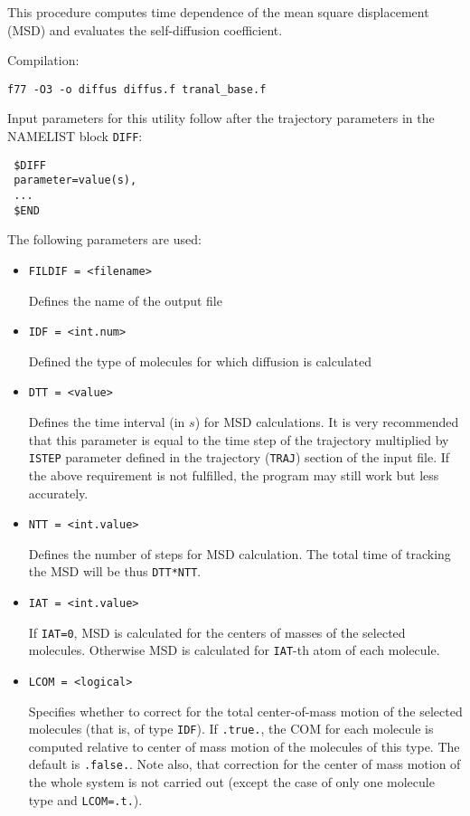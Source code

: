\documentclass{article}
\begin{document}
This procedure computes time dependence of the mean square displacement
(MSD) and evaluates the self-diffusion coefficient.

Compilation:

\verb|f77 -O3 -o diffus diffus.f tranal_base.f|

Input parameters for this utility follow after the trajectory parameters
in the NAMELIST block \verb|DIFF|:

\begin{verbatim}
 $DIFF
 parameter=value(s),
 ...
 $END
\end{verbatim}

The following parameters are used:

\begin{itemize}

\item
\verb|FILDIF = <filename>|

Defines the name of the output file

\item
\verb|IDF = <int.num>|

Defined the type of molecules for which diffusion is calculated

\item
\verb|DTT = <value>|

Defines the time interval (in $s$) for MSD calculations. It is very recommended
that this parameter is equal to the time step of the trajectory multiplied
by \verb|ISTEP| parameter defined in the trajectory (\verb|TRAJ|) section
of the input file. If the above requirement is not fulfilled, the program
may still work but less accurately. 

\item
\verb|NTT = <int.value>|

Defines the number of steps for MSD calculation. The total time of tracking 
the MSD will be thus \verb|DTT*NTT|.

\item
\verb|IAT = <int.value>|

If \verb|IAT=0|, MSD is calculated for the centers of masses of the selected
molecules. Otherwise MSD is calculated for \verb|IAT|-th atom of each 
molecule. 

\item
\verb|LCOM = <logical>|

Specifies whether to correct for the total center-of-mass motion of the
selected molecules (that is, of type \verb|IDF|). If \verb|.true.|, the
COM for each molecule is computed relative to center of mass motion of
the molecules of this type. The default is \verb|.false.|. Note also, that
correction for the center of mass motion of the whole system is not
carried out (except the case of only one molecule type and 
\verb|LCOM=.t.|). 


\end{itemize}
\end{document}
